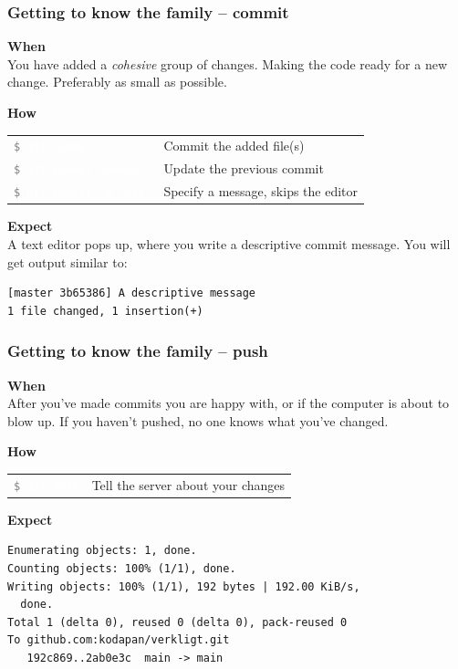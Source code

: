\documentclass{beamer}
\newcommand{\keyword}[1]{\hspace{-1.0em}\textcolor{lkblue}{\textbf{#1}}\vspace{0.2em}} %
\newcommand{\command}[1]{\colorbox{black!78}{\vphantom{Ep}\texttt{\textcolor{gray}{\$}
\textcolor{white}{#1}}}}
\begin{document}
\begin{frame}[fragile]
  \frametitle{Getting to know the family -- commit}
  \keyword{When}\\
    You have added a \emph{cohesive} group of changes. Making
    the code ready for a new change. Preferably as small as possible.
  \vspace{0.5em}

  \keyword{How}\\
  \hspace{-0.95em}
  \begin{tabular}{ll}
    \command{git commit} & Commit the added file(s) \\
    \command{git commit --amend} & Update the previous commit \\
    \command{git commit -m "msg"} & Specify a message, skips the editor \\
  \end{tabular}
  \vspace{0.5em}

  \keyword{Expect}\\
  A text editor pops up, where you write a descriptive commit message. You will get
  output similar to: \\
\begin{verbatim}
[master 3b65386] A descriptive message
1 file changed, 1 insertion(+)
\end{verbatim}

\end{frame}

\begin{frame}[fragile]
  \frametitle{Getting to know the family -- push}
  \keyword{When}\\
    After you've made commits you are happy with, or if the computer
    is about to blow up. If you haven't pushed, no one knows what
    you've changed. \\
  \vspace{0.5em}

  \keyword{How}\\
  \hspace{-0.95em}
  \begin{tabular}{ll}
    \command{git push} & Tell the server about your changes \\
  \end{tabular}
  \vspace{0.5em}

  \keyword{Expect}\\ [0.1em]
\begin{verbatim}
Enumerating objects: 1, done.
Counting objects: 100% (1/1), done.
Writing objects: 100% (1/1), 192 bytes | 192.00 KiB/s,
  done.
Total 1 (delta 0), reused 0 (delta 0), pack-reused 0
To github.com:kodapan/verkligt.git
   192c869..2ab0e3c  main -> main
\end{verbatim}
\end{frame}
\end{document}
